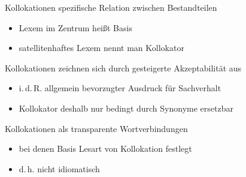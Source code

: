 \begin{frame}{Kollokationen}
\onslide<+->
spezifische Relation zwischen Bestandteilen
\begin{itemize}[<+->]
	\item		Lexem im Zentrum heißt Basis
	\item		satellitenhaftes Lexem nennt man Kollokator
\end{itemize}
\onslide<+->
\Zeile
\begin{exe}
	\ex\label{ex:kollokationen-002}
    \begin{xlist}
		\onslide<+->
		\onslide<+->
	\end{xlist}
\end{exe}
\end{frame}

\begin{frame}{Kollokationen}
\onslide<+->
zeichnen sich durch gesteigerte Akzeptabilität aus
\begin{itemize}[<+->]
	\item		i.\,d.\,R. allgemein bevorzugter Ausdruck für Sachverhalt
	\item		Kollokator deshalb nur bedingt durch Synonyme ersetzbar
\end{itemize}
\onslide<+->
\Zeile
\begin{exe}
	\ex\label{ex:kollokationen-003}
    \begin{xlist}
		\onslide<+->
		\onslide<+->
	\end{xlist}
\end{exe}
\end{frame}

\begin{frame}{Kollokationen}
\onslide<+->
als transparente Wortverbindungen
\begin{itemize}[<+->]
	\item		bei denen Basis Lesart von Kollokation festlegt
	\item		d.\,h. nicht idiomatisch
\end{itemize}
\onslide<+->
\Zeile
\begin{exe}
\end{exe}
\end{frame}


